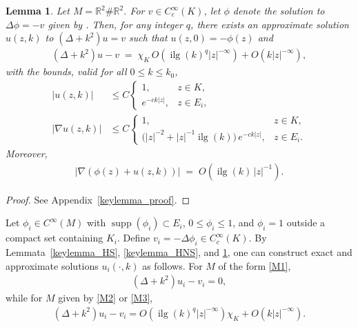 \documentclass[12pt]{amsart}
\newtheorem{lemma}[theorem]{Lemma}
\begin{document}
\begin{lemma}\label{keylemma}
Let $M=\mathbb{R}^2\# \mathbb{R}^2$.  
For $v \in C_c^\infty(K)$, let $\phi$ denote the solution to $\Delta \phi = -v$ given by \cite[Lemma~2.9]{HNS}. Then, for any integer $q$, there exists an approximate solution $u(z,k)$ to $(\Delta+k^2)u=v$ such that $u(z,0)=-\phi(z)$ and
\begin{align*}
    (\Delta+k^2)u - v \;=\; \chi_K\, O(\operatorname{ilg}(k)^q |z|^{-\infty}) + O(k |z|^{-\infty}),
\end{align*}
with the bounds, valid for all $0 \leq k \leq k_0$,
\begin{align*}
    |u(z,k)| &\le C \begin{cases}
        1, & z \in K, \\[4pt]
        e^{-ck|z|}, & z \in E_i,
    \end{cases} \\[6pt]
    |\nabla u(z,k)| &\le C \begin{cases}
        1, & z \in K, \\[4pt]
        \big(|z|^{-2} + |z|^{-1}\operatorname{ilg}(k)\big)\, e^{-ck|z|}, & z \in E_i.
    \end{cases}
\end{align*}
Moreover,
\begin{align}\label{deri2}
    |\nabla(\phi(z)+u(z,k))| \;=\; O(\operatorname{ilg}(k)\,|z|^{-1}).
\end{align}
\end{lemma}

\begin{proof}
See Appendix~\ref{keylemma_proof}.
\end{proof}




Let $\phi_i \in C^\infty(M)$ with $\operatorname{supp}(\phi_i)\subset E_i$, $0 \leq \phi_i \leq 1$, and $\phi_i=1$ outside a compact set containing $K_i$. Define $v_i = -\Delta \phi_i \in C_c^\infty(K)$.  
By Lemmata~\ref{keylemma_HS}, \ref{keylemma_HNS}, and \ref{keylemma}, one can construct exact and approximate solutions $u_i(\cdot,k)$ as follows. For $M$ of the form \eqref{M1},
\begin{align*}
    (\Delta+k^2)u_i - v_i = 0,
\end{align*}
while for $M$ given by \eqref{M2} or \eqref{M3},
\begin{align*}
    (\Delta+k^2)u_i - v_i 
    = O\!\left(\operatorname{ilg}(k)^q |z|^{-\infty}\right)\chi_K + O(k|z|^{-\infty}).
\end{align*}
\end{document}
